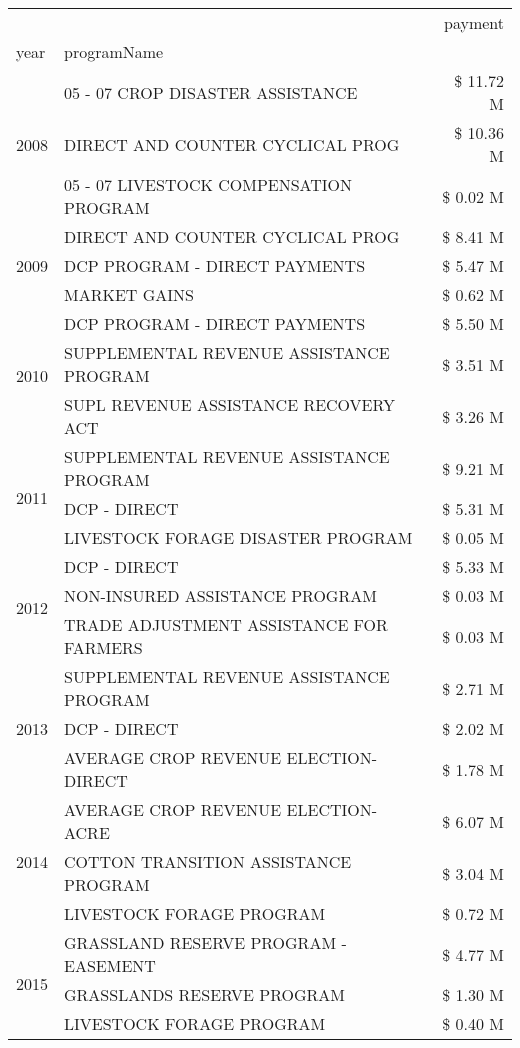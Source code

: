 \begin{tabular}{llr}
\toprule
 &  & payment \\
year & programName &  \\
\midrule
\multirow[t]{3}{*}{2008} & 05 - 07 CROP DISASTER ASSISTANCE & \$ 11.72 M \\
 & DIRECT AND COUNTER CYCLICAL PROG & \$ 10.36 M \\
 & 05 - 07 LIVESTOCK COMPENSATION PROGRAM & \$ 0.02 M \\
\cline{1-3}
\multirow[t]{3}{*}{2009} & DIRECT AND COUNTER CYCLICAL PROG & \$ 8.41 M \\
 & DCP PROGRAM - DIRECT PAYMENTS & \$ 5.47 M \\
 & MARKET GAINS & \$ 0.62 M \\
\cline{1-3}
\multirow[t]{3}{*}{2010} & DCP PROGRAM - DIRECT PAYMENTS & \$ 5.50 M \\
 & SUPPLEMENTAL REVENUE ASSISTANCE PROGRAM & \$ 3.51 M \\
 & SUPL REVENUE ASSISTANCE RECOVERY ACT & \$ 3.26 M \\
\cline{1-3}
\multirow[t]{3}{*}{2011} & SUPPLEMENTAL REVENUE ASSISTANCE PROGRAM & \$ 9.21 M \\
 & DCP - DIRECT & \$ 5.31 M \\
 & LIVESTOCK FORAGE DISASTER PROGRAM & \$ 0.05 M \\
\cline{1-3}
\multirow[t]{3}{*}{2012} & DCP - DIRECT & \$ 5.33 M \\
 & NON-INSURED ASSISTANCE PROGRAM & \$ 0.03 M \\
 & TRADE ADJUSTMENT ASSISTANCE FOR FARMERS & \$ 0.03 M \\
\cline{1-3}
\multirow[t]{3}{*}{2013} & SUPPLEMENTAL REVENUE ASSISTANCE PROGRAM & \$ 2.71 M \\
 & DCP - DIRECT & \$ 2.02 M \\
 & AVERAGE CROP REVENUE ELECTION-DIRECT & \$ 1.78 M \\
\cline{1-3}
\multirow[t]{3}{*}{2014} & AVERAGE CROP REVENUE ELECTION-ACRE & \$ 6.07 M \\
 & COTTON TRANSITION ASSISTANCE PROGRAM & \$ 3.04 M \\
 & LIVESTOCK FORAGE PROGRAM & \$ 0.72 M \\
\cline{1-3}
\multirow[t]{3}{*}{2015} & GRASSLAND RESERVE PROGRAM - EASEMENT & \$ 4.77 M \\
 & GRASSLANDS RESERVE PROGRAM & \$ 1.30 M \\
 & LIVESTOCK FORAGE PROGRAM & \$ 0.40 M \\

\end{tabular}
